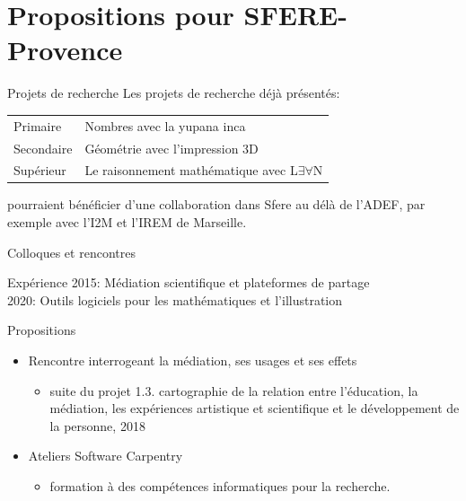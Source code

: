 \documentclass[
  french,
  ignorenonframetext,
]{beamer}
\providecommand{\tightlist}{%
  \setlength{\itemsep}{0pt}\setlength{\parskip}{0pt}}
\begin{document}
\hypertarget{propositions-pour-sfere-provence}{%
\section{Propositions pour
SFERE-Provence}\label{propositions-pour-sfere-provence}}

\begin{frame}{Projets de recherche}
\protect\hypertarget{projets-de-recherche}{}
Les projets de recherche déjà présentés:

\begin{longtable}[]{@{}ll@{}}
\toprule
\endhead
Primaire & Nombres avec la yupana inca\tabularnewline
Secondaire & Géométrie avec l'impression 3D\tabularnewline
Supérieur & Le raisonnement mathématique avec L\(∃∀\)N\tabularnewline
\bottomrule
\end{longtable}

pourraient bénéficier d'une collaboration dans Sfere au délà de l'ADEF,
par exemple avec l'I2M et l'IREM de Marseille.
\end{frame}

\begin{frame}{Colloques et rencontres}
\protect\hypertarget{colloques-et-rencontres}{}
\begin{block}{Expérience}
\protect\hypertarget{expuxe9rience}{}
2015: Médiation scientifique et plateformes de partage\\
2020: Outils logiciels pour les mathématiques et l'illustration
\end{block}

\begin{block}{Propositions}
\protect\hypertarget{propositions}{}
\begin{itemize}
\tightlist
\item
  Rencontre interrogeant la médiation, ses usages et ses effets

  \begin{itemize}
  \tightlist
  \item
    suite du projet 1.3. cartographie de la relation entre l'éducation,
    la médiation, les expériences artistique et scientifique et le
    développement de la personne, 2018
  \end{itemize}
\item
  Ateliers Software Carpentry

  \begin{itemize}
  \tightlist
  \item
    formation à des compétences informatiques pour la recherche.
  \end{itemize}
\end{itemize}
\end{block}
\end{frame}
\end{document}
